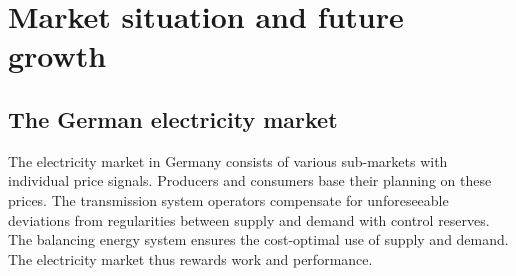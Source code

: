 

\chapter{Market situation and future growth}

\section{The German electricity market}
The electricity market in Germany consists of various sub-markets with individual price signals. Producers and consumers base their planning on these prices. The transmission system operators compensate for unforeseeable deviations from regularities between supply and demand with control reserves. The balancing energy system ensures the cost-optimal use of supply and demand. The electricity market thus rewards work and performance.

